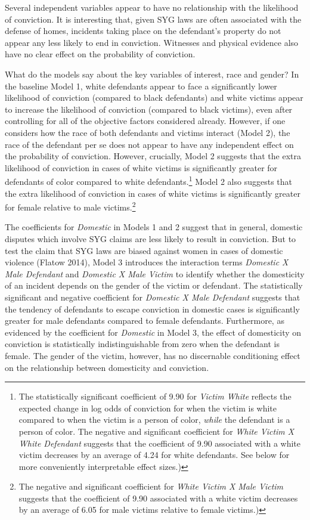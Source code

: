 \documentclass[12pt,article]{article}
\begin{document}
Several independent variables appear to have no relationship with the
likelihood of conviction. It is interesting that, given SYG laws are
often associated with the defense of homes, incidents taking place on
the defendant's property do not appear any less likely to end in
conviction. Witnesses and physical evidence also have no clear effect on
the probability of conviction.

What do the models say about the key variables of interest, race and
gender? In the baseline Model 1, white defendants appear to face a
significantly lower likelihood of conviction (compared to black
defendants) and white victims appear to increase the likelihood of
conviction (compared to black victims), even after controlling for all
of the objective factors considered already. However, if one considers
how the race of both defendants and victims interact (Model 2), the race
of the defendant per se does not appear to have any independent effect
on the probability of conviction. However, crucially, Model 2 suggests
that the extra likelihood of conviction in cases of white victims is
significantly greater for defendants of color compared to white
defendants.\footnote{The statistically significant coefficient of 9.90
  for \emph{Victim White} reflects the expected change in log odds of
  conviction for when the victim is white compared to when the victim is
  a person of color, \emph{while} the defendant is a person of color.
  The negative and significant coefficient for \emph{White Victim X
  White Defendant} suggests that the coefficient of 9.90 associated with
  a white victim decreases by an average of 4.24 for white defendants.
  See below for more conveniently interpretable effect sizes.)} Model 2
also suggests that the extra likelihood of conviction in cases of white
victims is significantly greater for female relative to male
victims.\footnote{The negative and significant coefficient for
  \emph{White Victim X Male Victim} suggests that the coefficient of
  9.90 associated with a white victim decreases by an average of 6.05
  for male victims relative to female victims.)}

The coefficients for \emph{Domestic} in Models 1 and 2 suggest that in
general, domestic disputes which involve SYG claims are less likely to
result in conviction. But to test the claim that SYG laws are biased
against women in cases of domestic violence (Flatow 2014), Model 3
introduces the interaction terms \emph{Domestic X Male Defendant} and
\emph{Domestic X Male Victim} to identify whether the domesticity of an
incident depends on the gender of the victim or defendant. The
statistically significant and negative coefficient for \emph{Domestic X
Male Defendant} suggests that the tendency of defendants to escape
conviction in domestic cases is significantly greater for male
defendants compared to female defendants. Furthermore, as evidenced by
the coefficient for \emph{Domestic} in Model 3, the effect of
domesticity on conviction is statistically indistinguishable from zero
when the defendant is female. The gender of the victim, however, has no
discernable conditioning effect on the relationship between domesticity
and conviction.
\end{document}
